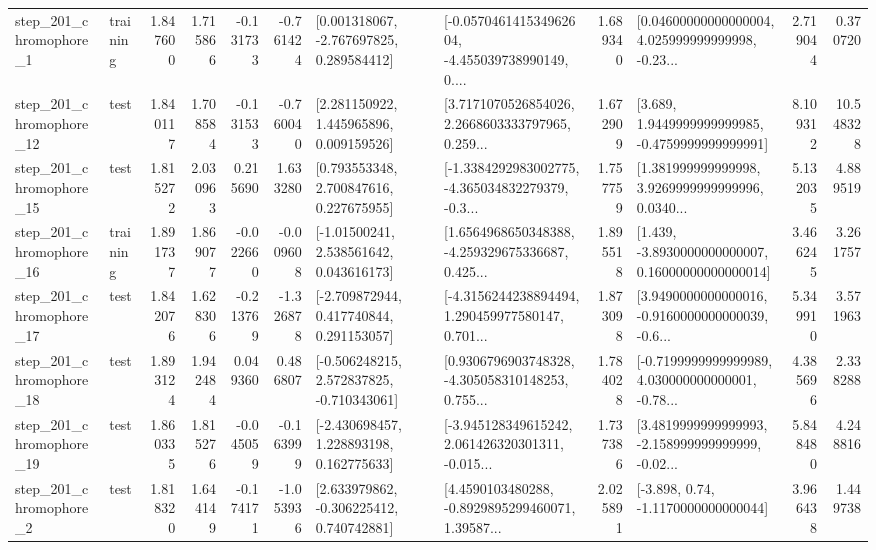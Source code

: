 \begin{tabular}{llrrrrllrlrr}
   step\_201\_chromophore\_1 &  training &      1.847600 &    1.715866 &     -0.131733 & -0.761424 &    [0.001318067, -2.767697825, 0.289584412] &  [-0.057046141534962604, -4.455039738990149, 0.... &       1.689340 &  [0.04600000000000004, 4.025999999999998, -0.23... &            2.719044 &          0.370720 \\
  step\_201\_chromophore\_12 &      test &      1.840117 &    1.708584 &     -0.131533 & -0.760040 &     [2.281150922, 1.445965896, 0.009159526] &  [3.7171070526854026, 2.2668603333797965, 0.259... &       1.672909 &   [3.689, 1.9449999999999985, -0.4759999999999991] &            8.109312 &         10.548328 \\
  step\_201\_chromophore\_15 &      test &      1.815272 &    2.030963 &      0.215690 &  1.633280 &     [0.793553348, 2.700847616, 0.227675955] &  [-1.3384292983002775, -4.365034832279379, -0.3... &       1.757759 &  [1.381999999999998, 3.9269999999999996, 0.0340... &            5.132035 &          4.889519 \\
  step\_201\_chromophore\_16 &  training &      1.891737 &    1.869077 &     -0.022660 & -0.009608 &     [-1.01500241, 2.538561642, 0.043616173] &  [1.6564968650348388, -4.259329675336687, 0.425... &       1.895518 &  [1.439, -3.8930000000000007, 0.16000000000000014] &            3.466245 &          3.261757 \\
  step\_201\_chromophore\_17 &      test &      1.842076 &    1.628306 &     -0.213769 & -1.326878 &    [-2.709872944, 0.417740844, 0.291153057] &  [-4.3156244238894494, 1.290459977580147, 0.701... &       1.873098 &  [3.9490000000000016, -0.9160000000000039, -0.6... &            5.349910 &          3.571963 \\
  step\_201\_chromophore\_18 &      test &      1.893124 &    1.942484 &      0.049360 &  0.486807 &   [-0.506248215, 2.572837825, -0.710343061] &  [0.9306796903748328, -4.305058310148253, 0.755... &       1.784028 &  [-0.7199999999999989, 4.030000000000001, -0.78... &            4.385696 &          2.338288 \\
  step\_201\_chromophore\_19 &      test &      1.860335 &    1.815276 &     -0.045059 & -0.163999 &    [-2.430698457, 1.228893198, 0.162775633] &  [-3.945128349615242, 2.061426320301311, -0.015... &       1.737386 &  [3.4819999999999993, -2.158999999999999, -0.02... &            5.848480 &          4.248816 \\
   step\_201\_chromophore\_2 &      test &      1.818320 &    1.644149 &     -0.174171 & -1.053936 &    [2.633979862, -0.306225412, 0.740742881] &  [4.4590103480288, -0.8929895299460071, 1.39587... &       2.025891 &                [-3.898, 0.74, -1.1170000000000044] &            3.966438 &          1.449738 \\

\end{tabular}
